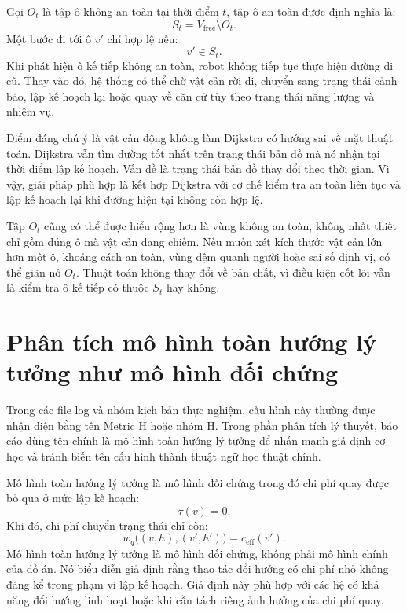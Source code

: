 \documentclass[../DoAn.tex]{subfiles}
\begin{document}
Gọi $O_t$ là tập ô không an toàn tại thời điểm $t$, tập ô an toàn được định nghĩa là:
\begin{equation}
S_t=V_{\text{free}}\setminus O_t.
\end{equation}
Một bước đi tới ô $v'$ chỉ hợp lệ nếu:
\begin{equation}
v'\in S_t.
\end{equation}
Khi phát hiện ô kế tiếp không an toàn, robot không tiếp tục thực hiện đường đi cũ. Thay vào đó, hệ thống có thể chờ vật cản rời đi, chuyển sang trạng thái cảnh báo, lập kế hoạch lại hoặc quay về căn cứ tùy theo trạng thái năng lượng và nhiệm vụ.

Điểm đáng chú ý là vật cản động không làm Dijkstra có hướng sai về mặt thuật toán. Dijkstra vẫn tìm đường tốt nhất trên trạng thái bản đồ mà nó nhận tại thời điểm lập kế hoạch. Vấn đề là trạng thái bản đồ thay đổi theo thời gian. Vì vậy, giải pháp phù hợp là kết hợp Dijkstra với cơ chế kiểm tra an toàn liên tục và lập kế hoạch lại khi đường hiện tại không còn hợp lệ.

Tập $O_t$ cũng có thể được hiểu rộng hơn là vùng không an toàn, không nhất thiết chỉ gồm đúng ô mà vật cản đang chiếm. Nếu muốn xét kích thước vật cản lớn hơn một ô, khoảng cách an toàn, vùng đệm quanh người hoặc sai số định vị, có thể giãn nở $O_t$. Thuật toán không thay đổi về bản chất, vì điều kiện cốt lõi vẫn là kiểm tra ô kế tiếp có thuộc $S_t$ hay không.

\section{Phân tích mô hình toàn hướng lý tưởng như mô hình đối chứng}

Trong các file log và nhóm kịch bản thực nghiệm, cấu hình này thường được nhận diện bằng tên Metric H hoặc nhóm H. Trong phần phân tích lý thuyết, báo cáo dùng tên chính là mô hình toàn hướng lý tưởng để nhấn mạnh giả định cơ học và tránh biến tên cấu hình thành thuật ngữ học thuật chính.

Mô hình toàn hướng lý tưởng là mô hình đối chứng trong đó chi phí quay được bỏ qua ở mức lập kế hoạch:
\begin{equation}
\tau(v)=0.
\end{equation}
Khi đó, chi phí chuyển trạng thái chỉ còn:
\begin{equation}
w_q\bigl((v,h),(v',h')\bigr)=c_{\text{eff}}(v').
\end{equation}
Mô hình toàn hướng lý tưởng là mô hình đối chứng, không phải mô hình chính của đồ án. Nó biểu diễn giả định rằng thao tác đổi hướng có chi phí nhỏ không đáng kể trong phạm vi lập kế hoạch. Giả định này phù hợp với các hệ có khả năng đổi hướng linh hoạt hoặc khi cần tách riêng ảnh hưởng của chi phí quay.
\end{document}
